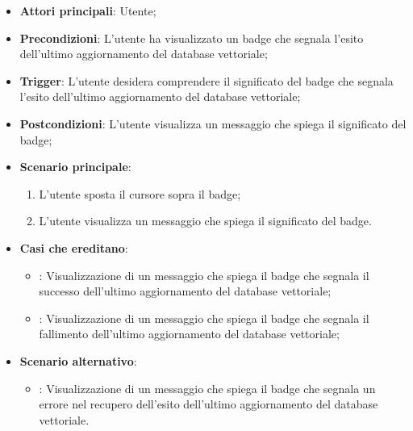 \begin{itemize}
    \item \textbf{Attori principali}: Utente;
    \item \textbf{Precondizioni}: L'utente ha visualizzato un badge che segnala l'esito dell'ultimo aggiornamento del database vettoriale;
    \item \textbf{Trigger}: L'utente desidera comprendere il significato del badge che segnala l'esito dell'ultimo aggiornamento del database vettoriale;
    \item \textbf{Postcondizioni}: L'utente visualizza un messaggio che spiega il significato del badge;
    \item \textbf{Scenario principale}:
    \begin{enumerate}
        \item L'utente sposta il cursore sopra il badge;
        \item L'utente visualizza un messaggio che spiega il significato del badge.
    \end{enumerate}
    \item \textbf{Casi che ereditano}:
    \begin{itemize}
        \item {}: Visualizzazione di un messaggio che spiega il badge che segnala il successo dell'ultimo aggiornamento del database vettoriale;
        \item {}: Visualizzazione di un messaggio che spiega il badge che segnala il fallimento dell'ultimo aggiornamento del database vettoriale;
    \end{itemize}
    \item \textbf{Scenario alternativo}:
    \begin{itemize}
        \item {}: Visualizzazione di un messaggio che spiega il badge che segnala un errore nel recupero dell'esito dell'ultimo aggiornamento del database vettoriale.
    \end{itemize}
\end{itemize}

\hypertarget{UC22}{}
